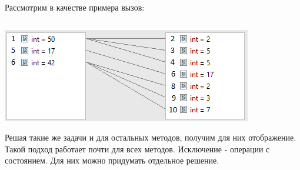 \begin{frame}
\frametitle{\insertsection} 
\framesubtitle{\insertsubsection}
Рассмотрим в качестве примера вызов:
\inputminted{java}{code/FlatMapFactorizeExample.java}
\includegraphics[scale=0.8]{img/flatMapExample.png}

Решая такие же задачи и для остальных методов, получим для них отображение. Такой подход работает почти для всех методов. Исключение - операции с состоянием. Для них можно придумать отдельное решение.
\end{frame}
